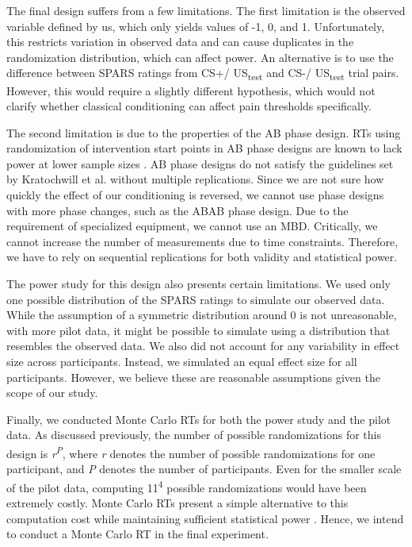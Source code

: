 \documentclass[empirical,issue, twocolumn,authordate]{jote-new-article}
\begin{document}
The final design suffers from a few limitations. The first limitation is the observed variable defined by us, which only yields values of -1, 0, and 1. Unfortunately, this restricts variation in observed data and can cause duplicates in the randomization distribution, which can affect power. An alternative is to use the difference between SPARS ratings from CS+/ US\textsubscript{test} and CS-/ US\textsubscript{test} trial pairs. However, this would require a slightly different hypothesis, which would not clarify whether classical conditioning can affect pain thresholds specifically.



The second limitation is due to the properties of the AB phase design. RTs using randomization of intervention start points in AB phase designs are known to lack power at lower sample sizes \parencite{Michiels2019}. AB phase designs do not satisfy the guidelines set by Kratochwill et al. \parencite{Kratochwill2010a} without multiple replications. Since we are not sure how quickly the effect of our conditioning is reversed, we cannot use phase designs with more phase changes, such as the ABAB phase design. Due to the requirement of specialized equipment, we cannot use an MBD. Critically, we cannot increase the number of measurements due to time constraints. Therefore, we have to rely on sequential replications for both validity and statistical power. 

The power study for this design also presents certain limitations. We used only one possible distribution of the SPARS ratings to simulate our observed data. While the assumption of a symmetric distribution around 0 is not unreasonable, with more pilot data, it might be possible to simulate using a distribution that resembles the observed data. We also did not account for any variability in effect size across participants. Instead, we simulated an equal effect size for all participants. However, we believe these are reasonable assumptions given the scope of our study. 

Finally, we conducted Monte Carlo RTs for both the power study and the pilot data. As discussed previously, the number of possible randomizations for this design is \emph{r}\textsuperscript{\emph{P}}, where \emph{r} denotes the number of possible randomizations for one participant, and \emph{P} denotes the number of participants. Even for the smaller scale of the pilot data, computing 11\textsuperscript{4} possible randomizations would have been extremely costly. Monte Carlo RTs present a simple alternative to this computation cost while maintaining sufficient statistical power \parencite{Edgington1969, Hope1968}. Hence, we intend to conduct a Monte Carlo RT in the final experiment.
\end{document}
